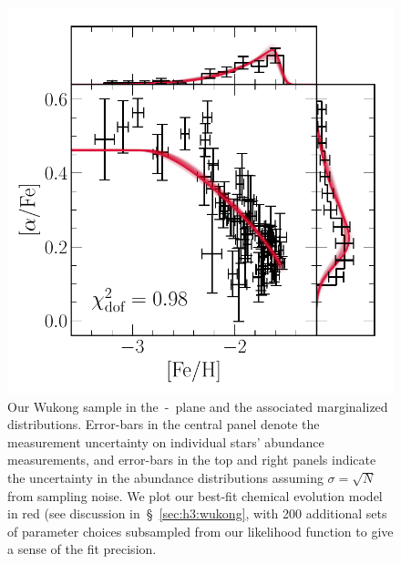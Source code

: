 \documentclass[ms.tex]{subfiles}
\begin{document}
\begin{figure}
\centering
\includegraphics[scale = 0.55]{wukong_bestfit.pdf}
\caption{
Our Wukong sample in the~\afe-\feh~plane and the associated marginalized
distributions.
Error-bars in the central panel denote the measurement uncertainty on
individual stars' abundance measurements, and error-bars in the top and right
panels indicate the uncertainty in the abundance distributions assuming
$\sigma = \sqrt{N}$ from sampling noise.
We plot our best-fit chemical evolution model in red (see discussion
in~\S~\ref{sec:h3:wukong}, with 200 additional sets of parameter choices
subsampled from our likelihood function to give a sense of the fit precision.
}
\label{fig:wukong_bestfit}
\end{figure}
\end{document}
